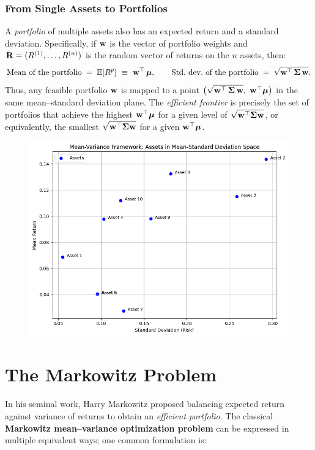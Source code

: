 \subsubsection{From Single Assets to Portfolios}
A \emph{portfolio} of multiple assets also has an expected return and a standard deviation. Specifically, if $\mathbf w$ is the vector of portfolio weights and $\mathbf R=(R^{(1)},\dots,R^{(n)})$ is the random vector of returns on the $n$ assets, then:
\[
\text{Mean of the portfolio} \;=\; 
\mathbb{E}[R^p] 
~\equiv~ 
\mathbf w^\top\,\boldsymbol\mu,
\qquad
\text{Std.\ dev.\ of the portfolio} \;=\;
\sqrt{\mathbf w^\top\,\mathbf \Sigma\,\mathbf w}.
\]
Thus, any feasible portfolio \(\mathbf w\) is mapped to a point \(\bigl(\sqrt{\mathbf w^\top\,\mathbf \Sigma\,\mathbf w},\;\mathbf w^\top \boldsymbol\mu\bigr)\) in the same mean--standard deviation plane. The \emph{efficient frontier} is precisely the set of portfolios that achieve the highest \(\mathbf w^\top \boldsymbol\mu\) for a given level of \(\sqrt{\mathbf w^\top \mathbf \Sigma \mathbf w}\), or equivalently, the smallest \(\sqrt{\mathbf w^\top \mathbf \Sigma \mathbf w}\) for a given \(\mathbf w^\top \boldsymbol\mu\).


\begin{figure}[H]
  \centering
  \includegraphics[scale=0.7]{points.png}
\end{figure}


\section{The Markowitz Problem}
In his seminal work, Harry Markowitz proposed balancing expected return against variance of returns to obtain an \emph{efficient portfolio}. The classical \textbf{Markowitz mean--variance optimization problem} can be expressed in multiple equivalent ways; one common formulation is:

